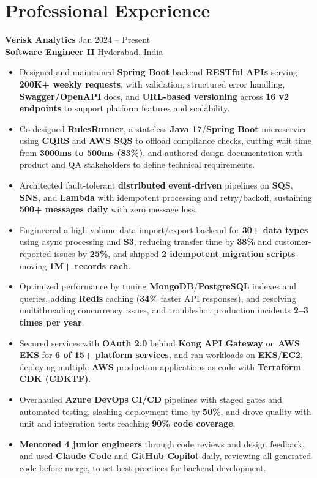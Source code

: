 \documentclass[a4paper,10pt]{article}
\begin{document}
\section*{Professional Experience}

\textbf{Verisk Analytics} \hfill Jan 2024 -- Present \\
\textbf{Software Engineer II} \hfill Hyderabad, India

\begin{itemize}[leftmargin=*]
    \item Designed and maintained \textbf{Spring Boot} backend \textbf{RESTful APIs} serving \textbf{200K+ weekly requests}, with validation, structured error handling, \textbf{Swagger/OpenAPI} docs, and \textbf{URL-based versioning} across \textbf{16 v2 endpoints} to support platform features and scalability.
    \item Co-designed \textbf{RulesRunner}, a stateless \textbf{Java 17}/\textbf{Spring Boot} microservice using \textbf{CQRS} and \textbf{AWS SQS} to offload compliance checks, cutting wait time from \textbf{3000ms to 500ms (83\%)}, and authored design documentation with product and QA stakeholders to define technical requirements.
    \item Architected fault-tolerant \textbf{distributed} \textbf{event-driven} pipelines on \textbf{SQS}, \textbf{SNS}, and \textbf{Lambda} with idempotent processing and retry/backoff, sustaining \textbf{500+ messages daily} with zero message loss.
    \item Engineered a high-volume data import/export backend for \textbf{30+ data types} using async processing and \textbf{S3}, reducing transfer time by \textbf{38\%} and customer-reported issues by \textbf{25\%}, and shipped \textbf{2 idempotent migration scripts} moving \textbf{1M+ records each}.
    \item Optimized performance by tuning \textbf{MongoDB}/\textbf{PostgreSQL} indexes and queries, adding \textbf{Redis} caching (\textbf{34\%} faster API responses), and resolving multithreading concurrency issues, and troubleshot production incidents \textbf{2--3 times per year}.
    \item Secured services with \textbf{OAuth 2.0} behind \textbf{Kong API Gateway} on \textbf{AWS EKS} for \textbf{6 of 15+ platform services}, and ran workloads on \textbf{EKS}/\textbf{EC2}, deploying multiple \textbf{AWS} production applications as code with \textbf{Terraform CDK (CDKTF)}.
    \item Overhauled \textbf{Azure DevOps} \textbf{CI/CD} pipelines with staged gates and automated testing, slashing deployment time by \textbf{50\%}, and drove quality with unit and integration tests reaching \textbf{90\% code coverage}.
    \item \textbf{Mentored 4 junior engineers} through code reviews and design feedback, and used \textbf{Claude Code} and \textbf{GitHub Copilot} daily, reviewing all generated code before merge, to set best practices for backend development.
\end{itemize}
\end{document}
